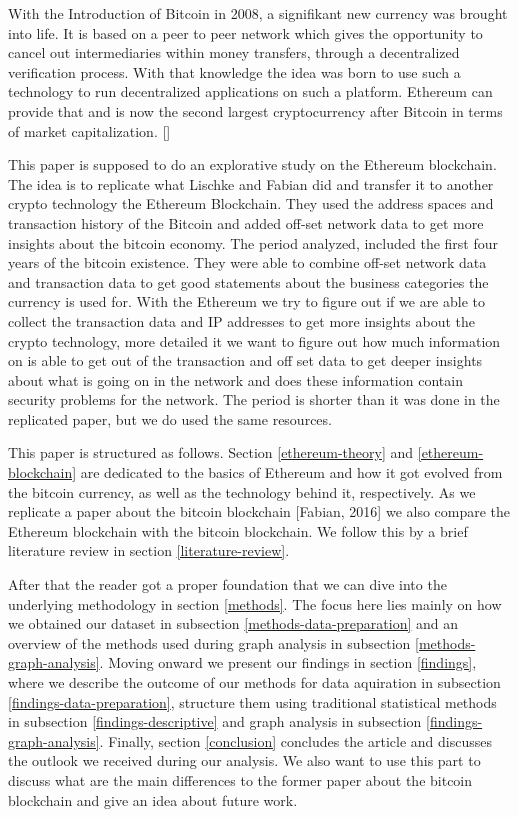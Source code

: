 With the Introduction of Bitcoin in 2008, a signifikant new currency was brought into life.
It is based on a peer to peer network which gives the opportunity to cancel out intermediaries within money transfers, through a decentralized verification process.
With that knowledge the idea was born to use such a technology to run decentralized applications on such a platform.
Ethereum can provide that and is now the second largest cryptocurrency after Bitcoin in terms of market capitalization. []

This paper is supposed to do an explorative study on the Ethereum blockchain. The idea is to replicate what Lischke and Fabian \cite{lischke2016analyzing} did and transfer it to another crypto technology the Ethereum Blockchain. They used the address spaces and transaction history of the Bitcoin and added off-set network data to get more insights about the bitcoin economy. The period analyzed, included the first four years of the bitcoin existence. They were able to combine off-set network data and transaction data to get good statements about the business categories the currency is used for. With the Ethereum we try to figure out if we are able to collect the transaction data and IP addresses to get more insights about the crypto technology, more detailed it we want to figure out how much information on is able to get out of the transaction and off set data to get deeper insights about what is going on in the network and does these information contain security problems for the network. The period is shorter than it was done in the replicated paper, but we do used the same resources. 

This paper is structured as follows. 
Section \ref{ethereum-theory} and \ref{ethereum-blockchain} are dedicated to the basics of Ethereum and how it got evolved from the bitcoin currency, as well as the technology behind it, respectively. 
As we replicate a paper about the bitcoin blockchain [Fabian, 2016] we also compare the Ethereum blockchain with the bitcoin blockchain. We follow this by a brief literature review in section \ref{literature-review}.


After that the reader got a proper foundation that we can dive into the underlying methodology in section \ref{methods}. 
The focus here lies mainly on how we obtained our dataset in subsection \ref{methods-data-preparation} and an overview of the methods used during graph analysis in subsection \ref{methods-graph-analysis}. 
Moving onward we present our findings in section \ref{findings}, where we describe the outcome of our methods for data aquiration in subsection \ref{findings-data-preparation}, structure them using traditional statistical methods in subsection \ref{findings-descriptive} and graph analysis in subsection \ref{findings-graph-analysis}.
Finally, section \ref{conclusion} concludes the article and discusses the outlook we received during our analysis. 
We also want to use this part to discuss what are the main differences to the former paper about the bitcoin blockchain and give an idea about future work. 
